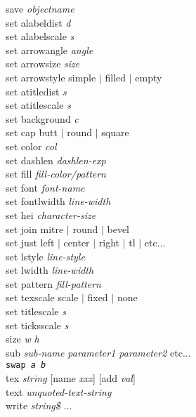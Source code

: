 {\sf save {\it objectname}}   \\
{\sf set alabeldist {\it d}}  \\
{\sf set alabelscale {\it s}}  \\
{\sf set arrowangle {\it angle}}  \\
{\sf set arrowsize {\it size}}  \\
{\sf set arrowstyle simple $|$ filled $|$ empty} \\
{\sf set atitledist {\it s}}  \\
{\sf set atitlescale {\it s}}  \\
{\sf set background {\it c}} \\
{\sf set cap butt $|$ round $|$ square} \\
{\sf set color {\it col}}  \\
{\sf set dashlen {\it dashlen-exp}}  \\
{\sf set fill {\it fill-color/pattern}}  \\
{\sf set font {\it font-name}}  \\
{\sf set fontlwidth {\it line-width}}  \\
{\sf set hei {\it character-size}}  \\
{\sf set join {\sf mitre $|$ round $|$ bevel }}  \\
{\sf set just left $|$ center $|$ right  $|$ tl $|$ etc...}  \\
{\sf set lstyle {\it line-style}}  \\
{\sf set lwidth {\it line-width}}  \\
{\sf set pattern {\it fill-pattern}}  \\
{\sf set texscale scale $|$ fixed $|$ none} \\
{\sf set titlescale {\it s}}  \\
{\sf set ticksscale {\it s}}  \\
{\sf size {\it w} {\it h}}  \\
{\sf sub {\it sub-name parameter1 parameter2} etc...}  \\
{\tt swap {\it a b } } \\
{\sf tex {\it string} [name {\it xxx}] [add {\it val}]}  \\
{\sf text {\it unquoted-text-string}}  \\
{\sf write {\it string\$} $\ldots$}


